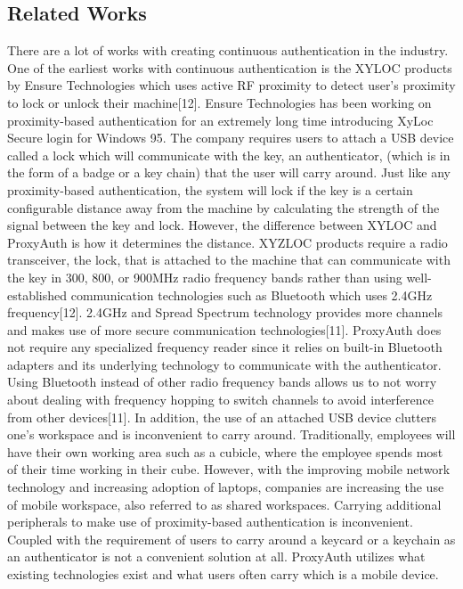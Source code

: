 \documentclass[letterpaper,twocolumn,10pt]{article}
\begin{document}
\subsection{Related Works} 
There are a lot of works with creating continuous authentication in the industry. One of the earliest works with continuous authentication is the XYLOC products by Ensure Technologies which uses active RF proximity to detect user's proximity to lock or unlock their machine[12]. Ensure Technologies has been working on proximity-based authentication for an extremely long time introducing XyLoc Secure login for Windows 95. The company requires users to attach a USB device called a lock which will communicate with the key, an authenticator, (which is in the form of a badge or a key chain) that the user will carry around. Just like any proximity-based authentication, the system will lock if the key is a certain configurable distance away from the machine by calculating the strength of the signal between the key and lock. However, the difference between XYLOC and ProxyAuth is how it determines the distance. XYZLOC products require a radio transceiver, the lock, that is attached to the machine that can communicate with the key in 300, 800, or 900MHz radio frequency bands rather than using well-established communication technologies such as Bluetooth which uses 2.4GHz frequency[12]. 2.4GHz and Spread Spectrum technology provides more channels and makes use of more secure communication technologies[11]. ProxyAuth does not require any specialized frequency reader since it relies on built-in Bluetooth adapters and its underlying technology to communicate with the authenticator. Using Bluetooth instead of other radio frequency bands allows us to not worry about dealing with frequency hopping to switch channels to avoid interference from other devices[11]. In addition, the use of an attached USB device clutters one's workspace and is inconvenient to carry around. Traditionally, employees will have their own working area such as a cubicle, where the employee spends most of their time working in their cube. However, with the improving mobile network technology and increasing adoption of laptops, companies are increasing the use of mobile workspace, also referred to as shared workspaces. Carrying additional peripherals to make use of proximity-based authentication is inconvenient. Coupled with the requirement of users to carry around a keycard or a keychain as an authenticator is not a convenient solution at all. ProxyAuth utilizes what existing technologies exist and what users often carry which is a mobile device.
\end{document}
